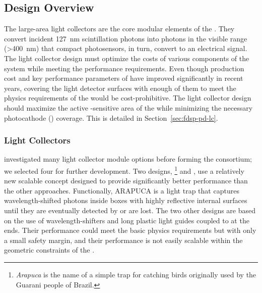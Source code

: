 \subsection{Design Overview}
\label{sec:pds:des-ov}

The  large-area light collectors are the core modular elements of the .  They convert incident \SI{127}{nm} scintillation photons into photons in the visible range (>\SI{400}{nm}) that compact  photosensors, in turn,  convert to an electrical signal. The light collector design must optimize the costs of various components of the system while meeting the performance requirements.  Even though production cost and key performance parameters of  have improved significantly in recent years, covering the light detector surfaces with enough of them to meet the physics requirements of the  would be cost-prohibitive. 
The light collector design should maximize the active -sensitive area of the  while minimizing the necessary photocathode () coverage. This is detailed in
Section~\ref{sec:fdsp-pd-lc}.

\subsubsection{Light Collectors} 
\label{sssec:photoncollectors}

 investigated many  light collector module options before forming the   consortium; we selected four for further development. 
Two designs, \footnote{\textit{Arapuca} is the name of a simple trap for catching birds originally used by the Guarani people of Brazil.} %
and , %
use a relatively new scalable concept designed to provide  
significantly better performance than the other approaches. Functionally, ARAPUCA is a light trap that captures wavelength-shifted photons inside boxes with highly reflective internal surfaces until they are eventually detected by  or are lost.  The two other designs are based on the use of wavelength-shifters and long plastic light guides coupled to  at the ends. Their performance could meet the basic physics requirements but with only a small safety margin, and their performance is not easily scalable within the geometric constraints of the . 

